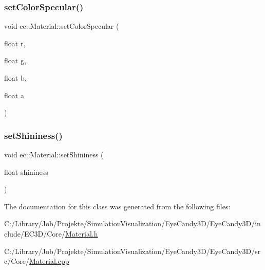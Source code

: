 \mbox{\label{classec_1_1_material_aa62e40f0571c25eb097f03c74849f918}} 
\subsubsection{\texorpdfstring{set\+Color\+Specular()}{setColorSpecular()}\hspace{0.1cm}{\footnotesize\ttfamily [2/2]}}
{\footnotesize\ttfamily void ec\+::\+Material\+::set\+Color\+Specular (\begin{DoxyParamCaption}\item[{float}]{r,  }\item[{float}]{g,  }\item[{float}]{b,  }\item[{float}]{a }\end{DoxyParamCaption})}

\mbox{\label{classec_1_1_material_a4b9efb15466a547d4579566dfb1e558f}} 
\subsubsection{\texorpdfstring{set\+Shininess()}{setShininess()}}
{\footnotesize\ttfamily void ec\+::\+Material\+::set\+Shininess (\begin{DoxyParamCaption}\item[{float}]{shininess }\end{DoxyParamCaption})}



The documentation for this class was generated from the following files\+:\begin{DoxyCompactItemize}
\item 
C\+:/\+Library/\+Job/\+Projekte/\+Simulation\+Visualization/\+Eye\+Candy3\+D/\+Eye\+Candy3\+D/include/\+E\+C3\+D/\+Core/\mbox{\hyperlink{_material_8h}{Material.\+h}}\item 
C\+:/\+Library/\+Job/\+Projekte/\+Simulation\+Visualization/\+Eye\+Candy3\+D/\+Eye\+Candy3\+D/src/\+Core/\mbox{\hyperlink{_material_8cpp}{Material.\+cpp}}\end{DoxyCompactItemize}
